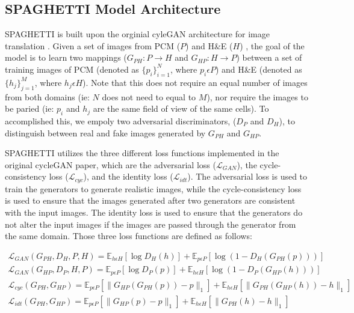 \begin{refsegment}
\subsection*{SPAGHETTI Model Architecture}
SPAGHETTI is built upon the orginial cyleGAN architecture for image translation \autocite{cyclegan2017}. Given a set of images from PCM ($P$) and H\&E ($H$) , the goal of the model is to learn two mappings ($G_{PH}: P \rightarrow H$ and $G_{HP}: H \rightarrow P$) between a set of training images of PCM (denoted as $\{p_{i}\}^{N}_{i=1}$, where $p_{i} \epsilon P$) and H\&E (denoted as $\{h_{j}\}^{M}_{j=1}$, where $h_{j} \epsilon H$). Note that this does not require an equal number of images from both domains (ie: $N$ does not need to equal to $M$), nor require the images to be paried (ie: $p_{i}$ and $h_{j}$ are the same field of view of the same cells). To accomplished this, we empoly two adversarial discriminators, ($D_{P}$ and $D_{H}$), to distinguish between real and fake images generated by $G_{PH}$ and $G_{HP}$. 

SPAGHETTI utilizes the three different loss functions implemented in the original cycleGAN paper, which are the adversarial loss ($\mathcal{L}_{GAN}$), the cycle-consistency loss ($\mathcal{L}_{cyc}$), and the identity loss ($\mathcal{L}_{idt}$). The adversarial loss is used to train the generators to generate realistic images, while the cycle-consistency loss is used to ensure that the images generated after two generators are consistent with the input images. The identity loss is used to ensure that the generators do not alter the input images if the images are passed through the generator from the same domain. Those three loss functions are defined as follows:

\begin{equation}
  \begin{aligned}
  \mathcal{L}_{GAN}(G_{PH}, D_{H}, P, H) = \mathbb{E}_{h \epsilon H}[\log D_{H}(h)] + \mathbb{E}_{p \epsilon P}[\log(1 - D_{H}(G_{PH}(p)))] \\
  \mathcal{L}_{GAN}(G_{HP}, D_{P}, H, P) = \mathbb{E}_{p \epsilon P}[\log D_{P}(p)] + \mathbb{E}_{h \epsilon H}[\log(1 - D_{P}(G_{HP}(h)))] \\
  \mathcal{L}_{cyc}(G_{PH}, G_{HP}) = \mathbb{E}_{p \epsilon P}[\|G_{HP}(G_{PH}(p)) - p\|_{1}] + \mathbb{E}_{h \epsilon H}[\|G_{PH}(G_{HP}(h)) - h\|_{1}] \\
  \mathcal{L}_{idt}(G_{PH}, G_{HP}) = \mathbb{E}_{p \epsilon P}[\|G_{HP}(p) - p\|_{1}] + \mathbb{E}_{h \epsilon H}[\|G_{PH}(h) - h\|_{1}] \\
  \end{aligned}
\end{equation}



\end{refsegment}
